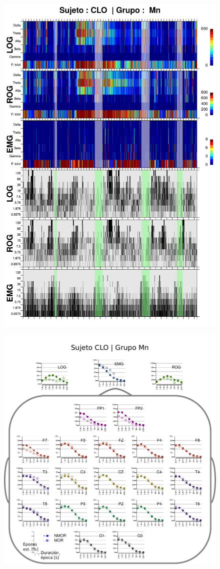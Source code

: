 \begin{figure}
\centering
\includegraphics[width=0.9\linewidth]
{./img_resultados/CLMN10SUE_combinado_.png} 
\end{figure}

\begin{figure}
\centering
\includegraphics[width=.9\linewidth]{./img_resultados/cabeza_CLO.pdf}
\end{figure}

